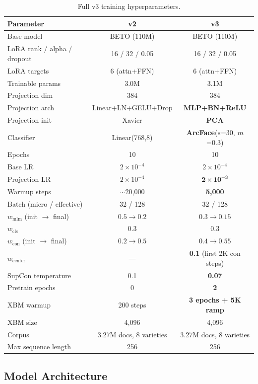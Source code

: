 \documentclass[11pt,a4paper]{article}
\begin{document}
\begin{table}[H]
\centering
\caption{Full v3 training hyperparameters.}
\begin{tabular}{lcc}
\toprule
\textbf{Parameter} & \textbf{v2} & \textbf{v3} \\
\midrule
Base model & BETO (110M) & BETO (110M) \\
LoRA rank / alpha / dropout & 16 / 32 / 0.05 & 16 / 32 / 0.05 \\
LoRA targets & 6 (attn+FFN) & 6 (attn+FFN) \\
Trainable params & 3.0M & 3.1M \\
\midrule
Projection dim & 384 & 384 \\
Projection arch & Linear+LN+GELU+Drop & \textbf{MLP+BN+ReLU} \\
Projection init & Xavier & \textbf{PCA} \\
Classifier & Linear(768,8) & \textbf{ArcFace}($s$=30, $m$=0.3) \\
\midrule
Epochs & 10 & 10 \\
Base LR & $2\times10^{-4}$ & $2\times10^{-4}$ \\
Projection LR & $2\times10^{-4}$ & $\mathbf{2\times10^{-3}}$ \\
Warmup steps & $\sim$20{,}000 & \textbf{5{,}000} \\
Batch (micro / effective) & 32 / 128 & 32 / 128 \\
\midrule
$w_{\text{mlm}}$ (init $\to$ final) & $0.5 \to 0.2$ & $\mathbf{0.3 \to 0.15}$ \\
$w_{\text{cls}}$ & 0.3 & 0.3 \\
$w_{\text{con}}$ (init $\to$ final) & $0.2 \to 0.5$ & $\mathbf{0.4 \to 0.55}$ \\
$w_{\text{center}}$ & --- & \textbf{0.1} (first 2K con steps) \\
SupCon temperature & 0.1 & \textbf{0.07} \\
\midrule
Pretrain epochs & 0 & \textbf{2} \\
XBM warmup & 200 steps & \textbf{3 epochs + 5K ramp} \\
XBM size & 4{,}096 & 4{,}096 \\
\midrule
Corpus & 3.27M docs, 8 varieties & 3.27M docs, 8 varieties \\
Max sequence length & 256 & 256 \\
\bottomrule
\end{tabular}
\end{table}

\subsection{Model Architecture}
\end{document}

